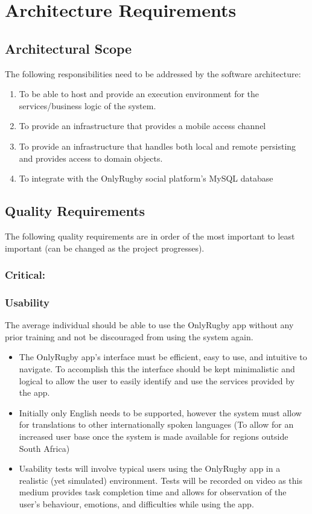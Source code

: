 \documentclass[hidelinks,a4paper,12pt]{article}
\begin{document}
\section{Architecture Requirements}
	\subsection{Architectural Scope}
	The following responsibilities need to be addressed by the software architecture:
	\begin{enumerate}
		\item To be able to host and provide an execution environment for the services/business logic of the system.
		\item To provide an infrastructure that provides a mobile access channel
		\item To provide an infrastructure that handles both local and remote persisting and provides access to domain objects.
		\item To integrate with the OnlyRugby social platform's MySQL database
	\end{enumerate}
\subsection{Quality Requirements}
	The following quality requirements are in order of the most important to least important (can be changed as the project progresses).	
	\subsubsection{Critical:}
	\subsubsection*{Usability}
	The average individual should be able to use the OnlyRugby app without any prior training and not be discouraged from using the system again.
	\begin{itemize}
		\item The OnlyRugby app's interface must be efficient, easy to use, and intuitive to navigate. To accomplish this the interface should be kept minimalistic and logical to allow the user to easily identify and use the services provided by the app.
		\item Initially only English needs to be supported, however the system must allow for translations to other internationally spoken languages (To allow for an increased user base once the system is made available for regions outside South Africa)
		\item Usability tests will involve typical users using the OnlyRugby app in a realistic (yet simulated) environment. Tests will be recorded on video as this medium provides task completion time and allows for observation of the user's behaviour, emotions, and difficulties while using the app.
	\end{itemize}
	
\end{document}
